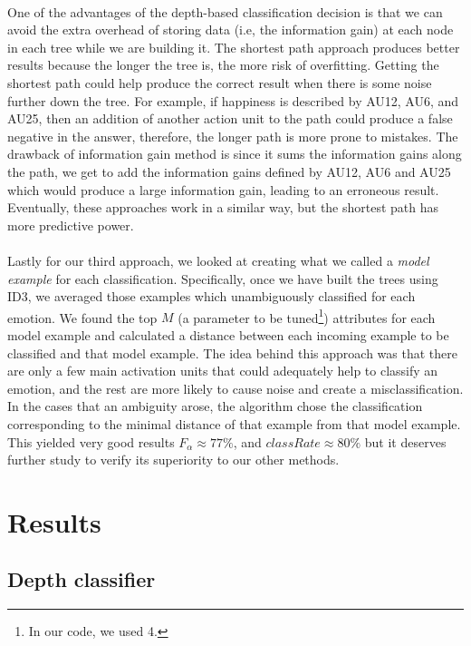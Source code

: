 \documentclass[a4paper,12pt,oneside,final]{report}
\begin{document}
\paragraph{}
One of the advantages of the depth-based classification decision is that we can avoid the extra overhead of storing data (i.e, the information gain) at each node in each tree while we are building it.  The shortest path approach produces better results because the longer the tree is, the more risk of overfitting. Getting the shortest path could help produce the correct result when there is some noise further down the tree. For example, if happiness is described by AU12, AU6, and AU25, then an addition of another action unit to the path could produce a false negative in the answer, therefore, the longer path is more prone to mistakes. The drawback of information gain method is since it sums the information gains along the path, we get to add the information gains defined by AU12, AU6 and AU25 which would produce a large information gain, leading to an erroneous result. Eventually, these approaches work in a similar way, but the shortest path has more predictive power.
\paragraph{}
Lastly for our third approach, we looked at creating what we called a \emph{model example} for each classification.  Specifically, once we have built the trees using ID3, we averaged those examples which unambiguously classified for each emotion.  We found the top $M$ (a parameter to be tuned\footnote{In our code, we used 4.}) attributes for each model example and calculated a distance between each incoming example to be classified and that model example.  The idea behind this approach was that there are only a few main activation units that could adequately help to classify an emotion, and the rest are more likely to cause noise and create a misclassification.  In the cases that an ambiguity arose, the algorithm chose the classification corresponding to the minimal distance of that example from that model example.  This yielded very good results $F_{\alpha}\approx 77\%$, and $classRate \approx 80\%$ but it deserves further study to verify its superiority to our other methods.

\section{Results}
\subsection{Depth classifier}
\end{document}
